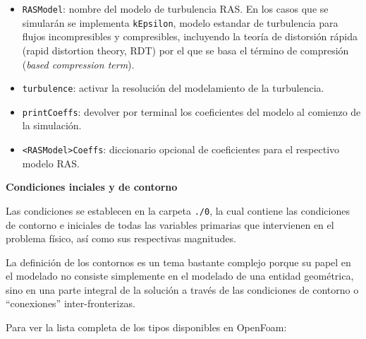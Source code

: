 \begin{itemize}
\item
  \texttt{RASModel}: nombre del modelo de turbulencia RAS. En los casos
  que se simularán se implementa \texttt{kEpsilon}, modelo estandar de
  turbulencia para flujos incompresibles y compresibles, incluyendo la
  teoría de distorsión rápida (rapid distortion theory, RDT) por el que
  se basa el término de compresión (\emph{based compression term}).
\item
  \texttt{turbulence}: activar la resolución del modelamiento de la
  turbulencia.
\item
  \texttt{printCoeffs}: devolver por terminal los coeficientes del
  modelo al comienzo de la simulación.
\item
  \texttt{\textless{}RASModel\textgreater{}Coeffs}: diccionario opcional
  de coeficientes para el respectivo modelo RAS.
\end{itemize}

\textbf{Condiciones inciales y de
contorno}

Las condiciones se establecen en la carpeta
\lstinline[style=bash]{./0}, la cual contiene las condiciones de
contorno e iniciales de todas las variables primarias que intervienen en
el problema físico, así como sus respectivas magnitudes.

La definición de los contornos es un tema bastante complejo porque su
papel en el modelado no consiste simplemente en el modelado de una
entidad geométrica, sino en una parte integral de la solución a través
de las condiciones de contorno o ``conexiones'' inter-fronterizas.

Para ver la lista completa de los tipos disponibles en OpenFoam:

